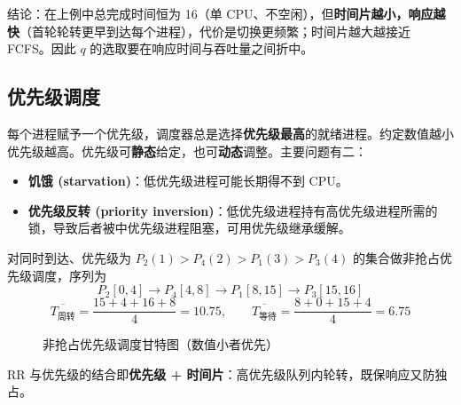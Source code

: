 \noindent 结论：在上例中总完成时间恒为 16（单 CPU、不空闲），但\textbf{时间片越小，响应越快}（首轮轮转更早到达每个进程），代价是切换更频繁；时间片越大越接近 FCFS。因此 $q$ 的选取要在响应时间与吞吐量之间折中。

\subsection{优先级调度}

每个进程赋予一个优先级，调度器总是选择\textbf{优先级最高}的就绪进程。约定数值越小优先级越高。优先级可\textbf{静态}给定，也可\textbf{动态}调整。主要问题有二：

\begin{itemize}
    \item \textbf{饥饿 (starvation)}：低优先级进程可能长期得不到 CPU。
    \item \textbf{优先级反转 (priority inversion)}：低优先级进程持有高优先级进程所需的锁，导致后者被中优先级进程阻塞，可用优先级继承缓解。
\end{itemize}

对同时到达、优先级为 $P_2(1)>P_4(2)>P_1(3)>P_3(4)$ 的集合做非抢占优先级调度，序列为
\[
P_2[0,4] \to P_4[4,8] \to P_1[8,15] \to P_3[15,16]
\]
\begin{equation}
    \overline{T_{\text{周转}}} = \frac{15+4+16+8}{4} = 10.75,\qquad
    \overline{T_{\text{等待}}} = \frac{8+0+15+4}{4} = 6.75
\end{equation}

\begin{figure}[H]
\centering
{}
\caption{非抢占优先级调度甘特图（数值小者优先）}
\end{figure}

\noindent RR 与优先级的结合即\textbf{优先级 + 时间片}：高优先级队列内轮转，既保响应又防独占。

